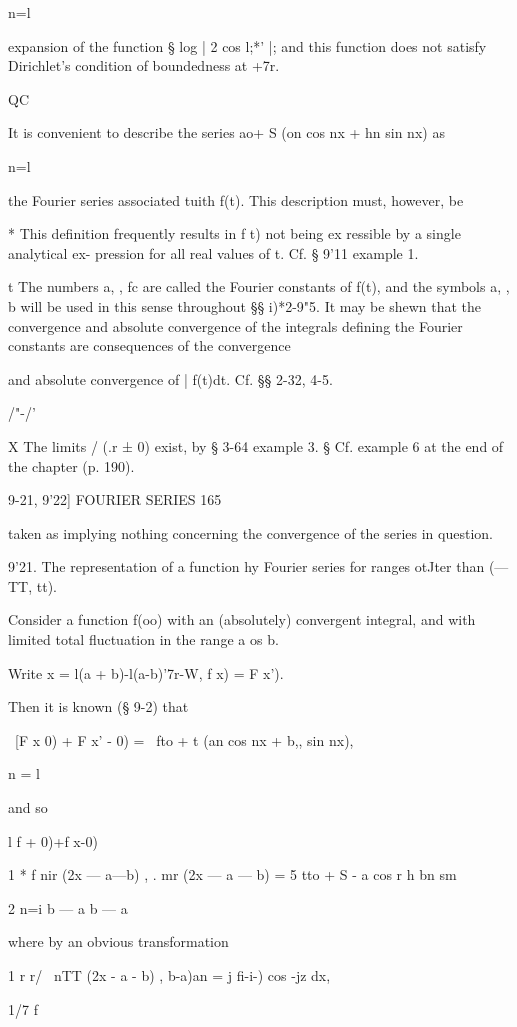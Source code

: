 n=l

expansion of the function § log | 2 cos l;*' |; and this function
does not satisfy Dirichlet's condition of boundedness at +7r.

QC

It is convenient to describe the series ao+ S (on cos nx + hn sin nx)
as

n=l

the Fourier series associated tuith f(t). This description must,
however, be

* This definition frequently results in f t) not being ex ressible by
a single analytical ex- pression for all real values of t. Cf. § 9'11
example 1.

t The numbers a, , fc are called the Fourier constants of f(t), and
the symbols a, , b will be used in this sense throughout §§ i)*2-9"5.
It may be shewn that the convergence and absolute convergence of the
integrals defining the Fourier constants are consequences of the
convergence

and absolute convergence of | f(t)dt. Cf. §§ 2-32, 4-5.

/"-/'

X The limits / (.r ± 0) exist, by § 3-64 example 3. § Cf. example 6 at
the end of the chapter (p. 190).

9-21, 9'22] FOURIER SERIES 165

taken as implying nothing concerning the convergence of the series in
question.

9'21. The representation of a function hy Fourier series for ranges
otJter than (— TT, tt).

Consider a function f(oo) with an (absolutely) convergent integral,
and with limited total fluctuation in the range a os b.

Write x = l(a + b)-l(a-b)'7r-W, f x) = F x').

Then it is known (§ 9-2) that

\ [F x 0) + F x' - 0) = \ fto + t (an cos nx + b,, sin nx),

n = l

and so

l f + 0)+f x-0)

1 * f nir (2x — a—b) , . mr (2x — a — b) = 5 tto + S - a cos r h bn sm

2 n=i b — a b — a

where by an obvious transformation

1 r r/ \ nTT (2x - a - b) , b-a)an = j fi-i-) cos -jz dx,

1/7 \; f%

